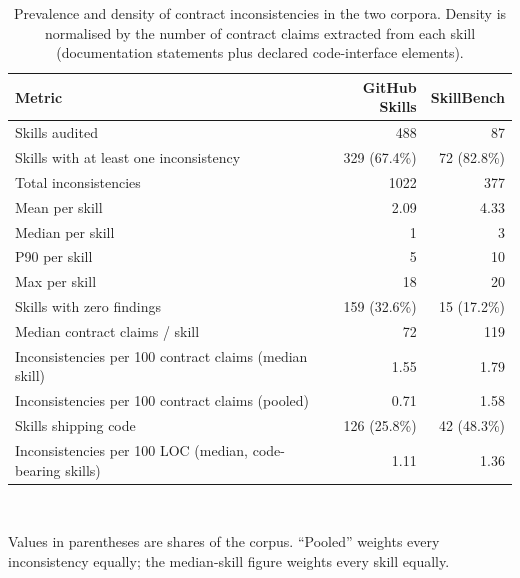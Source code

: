 \begin{table}[t]
  \centering
  \caption{Prevalence and density of contract inconsistencies in the two corpora. Density is normalised by the number of contract claims extracted from each skill (documentation statements plus declared code-interface elements).}
  \label{tab:rq1-prevalence}
  \small
  \setlength{\tabcolsep}{4pt}

  \begin{tabular}{lrr}
    \toprule
    Metric & GitHub Skills & SkillBench \\
    \midrule
    Skills audited & 488 & 87 \\
    Skills with at least one inconsistency & 329 (67.4\%) & 72 (82.8\%) \\
    Total inconsistencies & 1022 & 377 \\
    Mean per skill & 2.09 & 4.33 \\
    Median per skill & 1 & 3 \\
    P90 per skill & 5 & 10 \\
    Max per skill & 18 & 20 \\
    Skills with zero findings & 159 (32.6\%) & 15 (17.2\%) \\
    Median contract claims / skill & 72 & 119 \\
    Inconsistencies per 100 contract claims (median skill) & 1.55 & 1.79 \\
    Inconsistencies per 100 contract claims (pooled) & 0.71 & 1.58 \\
    Skills shipping code & 126 (25.8\%) & 42 (48.3\%) \\
    Inconsistencies per 100 LOC (median, code-bearing skills) & 1.11 & 1.36 \\
    \bottomrule
  \end{tabular}
  \\[2pt]
  \begin{minipage}{\linewidth}
    \footnotesize\raggedright Values in parentheses are shares of the corpus. ``Pooled'' weights every inconsistency equally; the median-skill figure weights every skill equally.
  \end{minipage}
\end{table}
